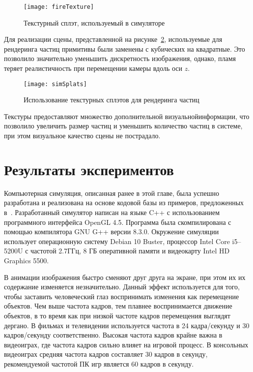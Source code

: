 \begin{figure}[htb]
	\centering
    \texttt{[image: fireTexture]}
    \caption{Текстурный сплэт, используемый в симуляторе}%
    \label{fig:fireTexture}
\end{figure}

Для реализации сцены, представленной на рисунке~\ref{fig:protoSplats},
используемые для рендеринга частиц примитивы были заменены с кубических на
квадратные. Это позволило значительно уменьшить дискретность изображения,
однако, пламя теряет реалистичность при перемещении камеры вдоль оси $z$.

\begin{figure}[htb]
	\centering
    \texttt{[image: simSplats]}
    \caption{Использование текстурных сплэтов для рендеринга частиц}%
    \label{fig:protoSplats}
\end{figure}

Текстуры предоставляют множество дополнительной визуальной\break{}информации, что
позволило увеличить размер частиц и уменьшить количество частиц в системе, при
этом визуальное качество сцены не пострадало.

\section{Результаты экспериментов}

Компьютерная симуляция, описанная ранее в этой главе, была
успешно разработана и реализована на основе кодовой базы из примеров,
предложенных в~\cite{LearnOGL}. Разработанный симулятор написан на языке C++ с
использованием программного интерфейса OpenGL 4.5. Программа была скомпилирована
с помощью компилятора GNU G++ версии 8.3.0. Окружение симуляции использует
операционную систему Debian 10 Buster, процессор Intel Core i5--5200U с частотой
2.7ГГц, 8 ГБ оперативной памяти и видеокарту Intel HD Graphics 5500.

В анимации изображения быстро сменяют друг друга на экране, при этом их их
содержание изменяется незначительно. Данный эффект используется для того, чтобы
заставить человеческий глаз воспринимать изменения как перемещение объектов. Чем
выше частота кадров, тем плавнее воспринимается движение объектов, в то время
как при низкой частоте кадров перемещения выглядят дергано. В фильмах и
телевидении используется частота в 24 кадра/секунду и 30 кадров/секунду
соответственно. Высокая частота кадров крайне важна в видеоиграх, где частота
кадров сильно влияет на игровой процесс. В консольных видеоиграх средняя частота
кадров составляет 30 кадров в секунду, рекомендуемой частотой ПК игр является 60
кадров в секунду.

